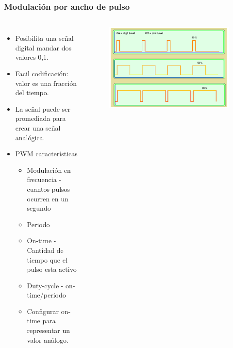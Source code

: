 \documentclass[10.5pt,scale=1.0,t,aspectratio=169,hyperref={pdfpagelabels=false}]{beamer}
\begin{document}
\begin{frame}
	\frametitle{Modulación por ancho de pulso}
	\vspace{-0.3cm}
	{\footnotesize
		\begin{columns}
			\begin{itemize}
				\item Posibilita una señal digital mandar dos valores 0,1.
				\item Facil codificación: valor es una fracción del tiempo.
				\item La señal puede ser promediada para crear una señal analógica.
				\item PWM características
				\begin{itemize}
					\item Modulación en frecuencia - cuantos pulsos ocurren en un segundo
					\item Periodo
					\item On-time - Cantidad de tiempo que el pulso esta activo
					\item Duty-cycle - on-time/periodo
					\item Configurar on-time para representar un valor análogo. 
				\end{itemize}
			\end{itemize}
			
			\begin{figure}
				\centering
				\includegraphics[scale=0.4]{09_PWMSignal}
			\end{figure}
			
		\end{columns}
	}
\end{frame}
\end{document}
